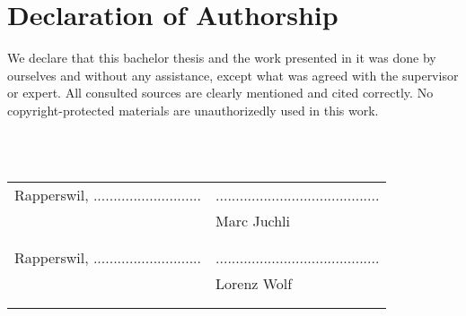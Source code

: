 \chapter*{Declaration of Authorship}
We declare that this bachelor thesis and the work presented in it was done by
ourselves and without any assistance, except what was agreed with the
supervisor or expert. All consulted sources are clearly mentioned and cited correctly. No
copyright-protected materials are unauthorizedly used in this work.

\hfill \\
\hfill \\

\begin{tabular}[l]{p{7cm} p{7cm}}
   Rapperswil, ...........................
   & ......................................... \\
   & Marc Juchli \\
   &\\ & \\
   Rapperswil, ...........................
   & ......................................... \\
   & Lorenz Wolf \\
   &\\ & \\
\end{tabular}

